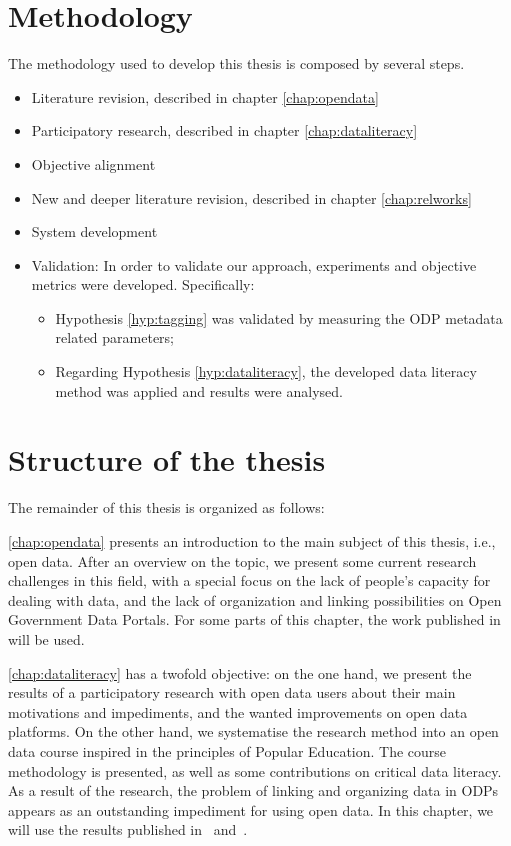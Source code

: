 \section{Methodology}
The methodology used to develop this thesis is composed by several steps.
\begin{itemize}
	\item Literature revision, described in chapter \ref{chap:opendata}
	\item Participatory research, described in chapter \ref{chap:dataliteracy}
	\item Objective alignment
	\item New and deeper literature revision, described in chapter \ref{chap:relworks}
	\item System development
	\item Validation: In order to validate our approach, experiments and objective metrics were developed. Specifically:
\begin{itemize}
	\item Hypothesis \ref{hyp:tagging} was validated by measuring the ODP metadata related parameters;
	\item Regarding Hypothesis \ref{hyp:dataliteracy}, the developed data literacy method was applied and results were analysed. 
\end{itemize}

\end{itemize}




\section{Structure of the thesis}

The remainder of this thesis is organized as follows:

\autoref{chap:opendata} presents an introduction to the main subject of this thesis, i.e., open data.
After an overview on the topic, we present some current research challenges in this field, with a special focus on the lack of people's capacity for dealing with data, and the lack of organization and linking possibilities on Open Government Data Portals. 
For some parts of this chapter, the work published in~ will be used.

\autoref{chap:dataliteracy} has a twofold objective: on the one hand, we present the results of a participatory research with open data users about their main motivations and impediments, and the wanted improvements on open data platforms. 
On the other hand, we systematise the research method into an open data course inspired in the principles of Popular Education.
The course methodology is presented, as well as some contributions on critical data literacy.
As a result of the research, the problem of linking and organizing data in ODPs appears as an outstanding impediment for using open data.
In this chapter, we will use the results published in~ and~.

